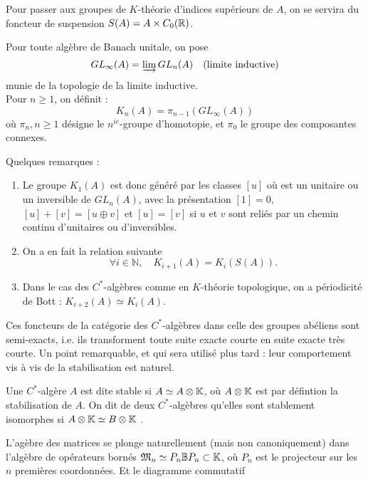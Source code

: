 Pour passer aux groupes de $K$-théorie d'indices supérieurs de $A$, on se servira du foncteur de suspension $S(A)=A\times C_0(\mathbb R)$.

\begin{definition}
Pour toute algèbre de Banach unitale, on pose \[GL_\infty(A) = \varinjlim GL_n(A) \quad \text{(limite inductive)}\]
munie de la topologie de la limite inductive.\\
Pour $n\geq 1$, on définit :
\[K_n(A)=\pi_{n-1}\left(GL_\infty (A)\right)\] 
où $\pi_n, n\geq 1$ désigne le $n^{ie}$-groupe d'homotopie, et $\pi_0$ le groupe des composantes connexes.
\end{definition}

Quelques remarques : 
\begin{enumerate}
\item Le groupe $K_1(A)$ est donc généré par les classes $[u]$ où est un unitaire ou un inversible de $GL_n(A)$, avec la présentation $[1]=0$, $[u]+[v]=[u\oplus v]$ et $[u]=[v]$ si $u$ et $v$ sont reliés par un chemin continu d'unitaires ou d'inversibles.
\item On a en fait la relation suivante \[\forall i\in \mathbb N, \quad K_{i+1}(A)=K_i(S(A)).\]
\item Dans le cas des $C^*$-algèbres comme en $K$-théorie topologique, on a périodicité de Bott : $K_{i+2}(A)\simeq K_i(A)$.\\
\end{enumerate}

 Ces foncteurs de la catégorie des $C^*$-algèbres dans celle des groupes abéliens sont semi-exacts, i.e. ils transforment toute suite exacte courte en suite exacte très courte. Un point remarquable, et qui sera utilisé plus tard : leur comportement vis à vis de la stabilisation est naturel.\\

\begin{definition}
Une $C^*$-algère $A$ est dite stable si $A\simeq A\otimes \mathbb K$, où $A\otimes \mathbb K$ est par défintion la stabilisation de $A$. On dit de deux $C^*$-algèbres qu'elles sont stablement isomorphes si $A\otimes \mathbb K \simeq B\otimes \mathbb K$ .
\end{definition}

L'agèbre des matrices se plonge naturellement (mais non canoniquement) dans l'algèbre de opérateurs bornés $\mathfrak M_n \simeq P_n \mathbb B P_n \subset \mathbb K $, où $P_n$ est le projecteur sur les $n$ premières coordonnées. Et le diagramme commutatif 

